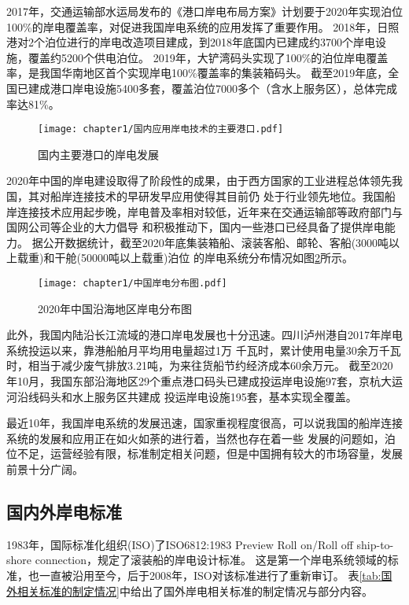 2017年，交通运输部水运局发布的《港口岸电布局方案》计划要于2020年实现泊位100\%的岸电覆盖率，对促进我国岸电系统的应用发挥了重要作用。
2018年，日照港对2个泊位进行的岸电改造项目建成，到2018年底国内已建成约3700个岸电设施，覆盖约5200个供电泊位。
2019年，大铲湾码头实现了100\%的泊位岸电覆盖率，是我国华南地区首个实现岸电100\%覆盖率的集装箱码头\cite{SP11}。
截至2019年底，全国已建成港口岸电设施5400多套，覆盖泊位7000多个（含水上服务区），总体完成率达81\%\cite{SP12}。

\begin{figure}[!htp]
	\centering
	\texttt{[image: chapter1/国内应用岸电技术的主要港口.pdf]}
	\caption{国内主要港口的岸电发展}
	\label{fig:国内主要港口的岸电发展}
\end{figure}

2020年中国的岸电建设取得了阶段性的成果，由于西方国家的工业进程总体领先我国，其对船岸连接技术的早研发早应用使得其目前仍
处于行业领先地位。我国船岸连接技术应用起步晚，岸电普及率相对较低，近年来在交通运输部等政府部门与国网公司等企业的大力倡导
和积极推动下，国内一些港口已经具备了提供岸电能力。
据公开数据统计，截至2020年底集装箱船、滚装客船、邮轮、客船(3000吨以上载重)和干舱(50000吨以上载重)泊位
的岸电系统分布情况如图\ref{fig:中国岸电分布图}所示。

\begin{figure}[!htp]
	\centering
	\texttt{[image: chapter1/中国岸电分布图.pdf]}
	\caption{ 2020年中国沿海地区岸电分布图}
	\label{fig:中国岸电分布图}
\end{figure}

此外，我国内陆沿长江流域的港口岸电发展也十分迅速\cite{SP17}。四川泸州港自2017年岸电系统投运以来，靠港船舶月平均用电量超过1万
千瓦时，累计使用电量30余万千瓦时，相当于减少废气排放3.21吨，为来往货船节约经济成本60余万元。
截至2020年10月，我国东部沿海地区29个重点港口码头已建成投运岸电设施97套，京杭大运河沿线码头和水上服务区共建成
投运岸电设施195套，基本实现全覆盖。

最近10年，我国岸电系统的发展迅速，国家重视程度很高，可以说我国的船岸连接系统的发展和应用正在如火如荼的进行着，当然也存在着一些
发展的问题如，泊位不足，运营经验有限，标准制定相关问题，但是中国拥有较大的市场容量，发展前景十分广阔。

\subsection{国内外岸电标准}

1983年，国际标准化组织(ISO)了ISO6812:1983 Preview Roll on/Roll off ship-to-shore connection，规定了滚装船的岸电设计标准。
这是第一个岸电系统领域的标准，也一直被沿用至今，后于2008年，ISO对该标准进行了重新审订\cite{SP4}。
表\ref{tab:国外相关标准的制定情况}中给出了国外岸电相关标准的制定情况与部分内容。

